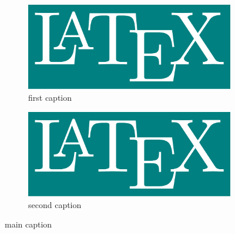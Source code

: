 \documentclass{article}
\begin{document}
  \begin{figure}
    \begin{subfigure}{0.5\linewidth}
      \centering
      \includegraphics[width=0.8\linewidth]{latex.pdf}
      \caption{first caption}
    \end{subfigure}%
    \begin{subfigure}{0.5\linewidth}
      \centering
      \includegraphics[width=0.8\linewidth]{latex.pdf}
      \caption{second caption}
    \end{subfigure}
    \caption{main caption}
  \end{figure}
\end{document}
